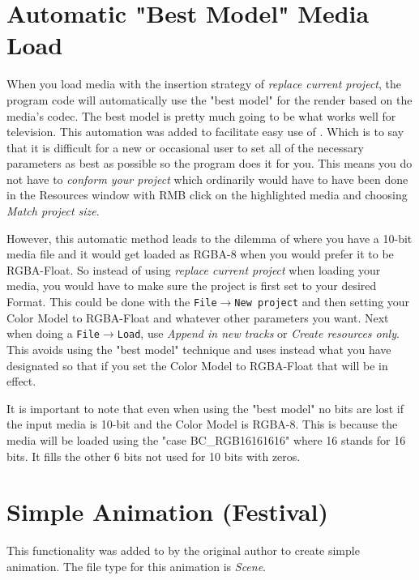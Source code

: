 \section{Automatic "Best Model" Media Load}%
\label{sec:conform_the_project}
When you load media with the insertion strategy of \textit{replace current project}, the program code will
automatically use the "best model" for the render based on the media's codec.  The best model is pretty
much going to be what works well for television.  This automation was added to facilitate easy use of
\CGG{}.  Which is to say that it is difficult for a new or occasional user to set all of the 
necessary parameters as best as possible so the program does it for you.  This means you do not have to 
\textit{conform your project} which ordinarily would have to have been done in the Resources window with RMB
click on the highlighted media and choosing \textit{Match project size}. 

However, this automatic method leads to the dilemma of where you have a 10-bit media file and it would
get loaded as RGBA-8 when you would prefer it to be RGBA-Float.  So instead of using \textit{replace current
project} when loading your media, you would have to make sure the project is first set to your desired
Format.  This could be done with the \texttt{File$\rightarrow$New project} and then setting your Color
Model to RGBA-Float and whatever other parameters you want.  Next when doing a \texttt{File$\rightarrow$Load}, use
\textit{Append in new tracks} or \textit{Create resources only}. This avoids using the "best model"
technique and uses instead what you have designated so that if you set the Color Model to RGBA-Float that
will be in effect.

It is important to note that even when using the "best model" no bits are lost if the input media is 10-bit
and the Color Model is RGBA-8. This is because the media will be loaded using the "case BC\_RGB16161616"
where 16 stands for 16 bits. It fills the other 6 bits not used for 10 bits with zeros.

\section{Simple Animation (Festival)}%
\label{sec:simple_animation_festival}

This functionality was added to \CGG{} by the original author to create simple animation.  The file type for this animation is \textit{Scene}.

